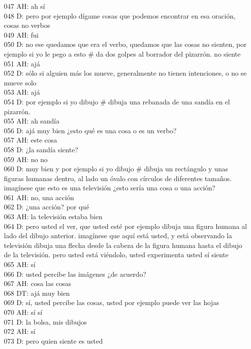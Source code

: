 047 AH: ah sí\\
048 D: pero por ejemplo dígame cosas que podemos encontrar en esa oración, cosas no verbos\\
049 AH: fui\\
050 D: no ese quedamos que era el verbo, quedamos que las cosas no sienten, por ejemplo si yo le pego a esto \# da dos golpes al borrador del pizarrón. no siente\\
051 AH: ajá\\
052 D: sólo si alguien más los mueve, generalmente no tienen intenciones, o no se mueve solo\\
053 AH: ajá\\
054 D: por ejemplo si yo dibujo \# dibuja una rebanada de una sandía en el pizarrón.\\
055 AH: ah sandía\\
056 D: ajá muy bien ¿esto qué es una cosa o es un verbo?\\
057 AH: este cosa\\
058 D: ¿la sandía siente?\\
059 AH: no no\\
060 D: muy bien y por ejemplo si yo dibujo \# dibuja un rectángulo y unas figuras humanas dentro, al lado un óvalo con círculos de diferentes tamaños. imagínese que esto es una televisión ¿esto sería una cosa o una acción?\\
061 AH: no, una acción\\
062 D: ¿una acción? por qué\\
063 AH: la televisión estaba bien\\
064 D: pero usted el ver, que usted esté por ejemplo  dibuja una figura humana al lado del dibujo anterior. imagínese que aquí está usted, y está observando la televisión  dibuja una flecha desde la cabeza de la figura humana hasta el dibujo de la televisión. pero usted está viéndolo, usted experimenta usted sí siente\\
065 AH: sí\\
066 D: usted percibe las imágenes ¿de acuerdo?\\
067 AH: cosa las cosas\\
068 DT: ajá muy bien\\
069 D: sí, usted percibe las cosas, usted por ejemplo puede ver las hojas\\
070 AH: sí sí\\
071 D: la bolsa, mis dibujos\\
072 AH: sí\\
073 D: pero quien siente es usted\\
